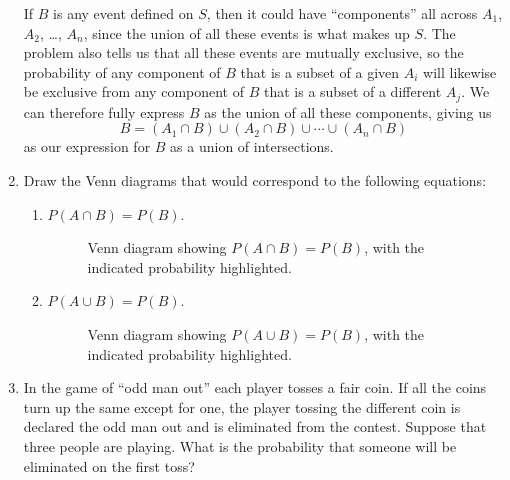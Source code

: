 \documentclass{article}
\begin{document}
\begin{enumerate}
\begin{solution}
        If \(B\) is any event defined on \(S\), then it could have ``components'' all across \(A_1\), \(A_2\), \ldots, \(A_n\), since the union of all these events is what makes up \(S\). 
        The problem also tells us that all these events are mutually exclusive, so the probability of any component of \(B\) that is a subset of a given \(A_i\) will likewise be exclusive 
        from any component of \(B\) that is a subset of a different \(A_j\). We can therefore fully express \(B\) as the union of all these components, giving us\[
            B = (A_1\cap{}B)\cup(A_2\cap{}B)\cup\cdots\cup(A_n\cap{}B)
        \]as our expression for \(B\) as a union of intersections. 
    \end{solution}
    \item Draw the Venn diagrams that would correspond to the following equations:\begin{enumerate}
        \item \(P(A\cap{}B) = P(B)\).\begin{figure}[h]
            \centering
            \caption{Venn diagram showing \(P(A\cap{}B) = P(B)\), with the indicated probability highlighted.}
        \end{figure}
        \item \(P(A\cup{}B) = P(B)\).\begin{figure}[h]
            \centering
            \caption{Venn diagram showing \(P(A\cup{}B) = P(B)\), with the indicated probability highlighted.}
        \end{figure}
    \end{enumerate}
    \item In the game of ``odd man out'' each player tosses a fair coin. If all the coins turn up the same except for one, the player tossing the different coin is declared the
    odd man out and is eliminated from the contest. Suppose that three people are playing. What is the probability that someone will be eliminated on the first toss?
\end{enumerate}
\end{document}
